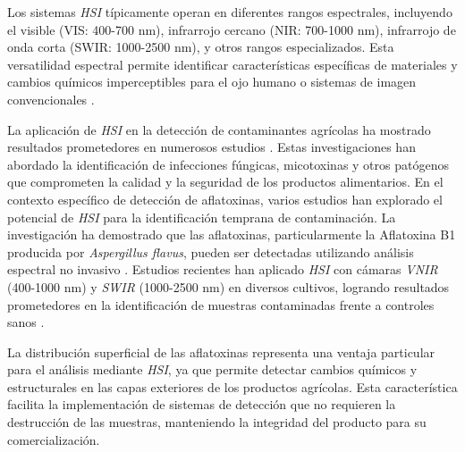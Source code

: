 \vspace{5mm}

Los sistemas \emph{HSI} típicamente operan en diferentes rangos espectrales, incluyendo el visible (VIS: 400-700 nm), infrarrojo cercano (NIR: 700-1000 nm), infrarrojo de onda corta (SWIR: 1000-2500 nm), y otros rangos especializados. Esta versatilidad espectral permite identificar características específicas de materiales y cambios químicos imperceptibles para el ojo humano o sistemas de imagen convencionales \cite{article}.

\vspace{5mm}

La aplicación de \emph{HSI} en la detección de contaminantes agrícolas ha mostrado resultados prometedores en numerosos estudios \cite{KHAN2022101678, WIEME2022156}. Estas investigaciones han abordado la identificación de infecciones fúngicas, micotoxinas y otros patógenos que comprometen la calidad y la seguridad de los productos alimentarios. En el contexto específico de detección de aflatoxinas, varios estudios han explorado el potencial de \emph{HSI} para la identificación temprana de contaminación. La investigación ha demostrado que las aflatoxinas, particularmente la Aflatoxina B1 producida por \emph{Aspergillus flavus}, pueden ser detectadas utilizando análisis espectral no invasivo \cite{agriengineering6040225}. Estudios recientes han aplicado \emph{HSI} con cámaras \emph{VNIR} (400-1000 nm) y \emph{SWIR} (1000-2500 nm) en diversos cultivos, logrando resultados prometedores en la identificación de muestras contaminadas frente a controles sanos \cite{article}.

\vspace{5mm}

La distribución superficial de las aflatoxinas representa una ventaja particular para el análisis mediante \emph{HSI}, ya que permite detectar cambios químicos y estructurales en las capas exteriores de los productos agrícolas. Esta característica facilita la implementación de sistemas de detección que no requieren la destrucción de las muestras, manteniendo la integridad del producto para su comercialización.

\vspace{5mm}

